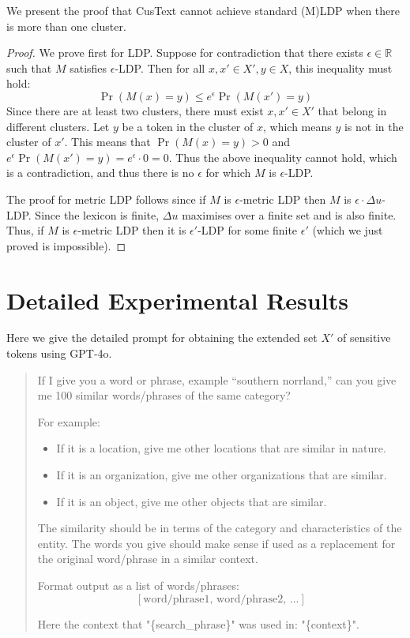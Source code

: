 We present the proof that CusText cannot achieve standard (M)LDP when there is more than one cluster.
\begin{proof}
    We prove first for LDP.  Suppose for contradiction that there exists $\epsilon\in \mathbb{R}$ such that $M$ satisfies $\epsilon$-LDP. Then for all $x, x' \in X', y \in X$, this inequality must hold: 
    $$
        \Pr(M(x) = y) \leq e^\epsilon \Pr(M(x') = y)
    $$
    Since there are at least two clusters, there must exist $x, x' \in X'$ that belong in different clusters. Let $y$ be a token in the cluster of $x$, which means $y$ is not in the cluster of $x'$. This means that $\Pr(M(x) = y) > 0$ and $e^\epsilon \Pr(M(x') = y) = e^\epsilon \cdot 0 = 0$. Thus the above inequality cannot hold, which is a contradiction, and thus there is no  $\epsilon$ for which $M$ is $\epsilon$-LDP.

     The proof for metric LDP follows since if $M$ is $\epsilon$-metric LDP then  $M$ is $\epsilon\cdot \Delta u$-LDP. Since the lexicon is finite, $\Delta u$ maximises over a finite set and is also finite. Thus, if $M$ is $\epsilon$-metric LDP then it is $\epsilon'$-LDP for some finite $\epsilon'$ (which we just proved is impossible).    
\end{proof}


\section{Detailed Experimental Results}

Here we give the detailed prompt for obtaining the extended set $X'$ of sensitive tokens using GPT-4o.

{\em
\begin{quote}
If I give you a word or phrase, example ``southern norrland,'' can you give me 100 similar words/phrases of the same category?

For example:
\begin{itemize}
    \item If it is a location, give me other locations that are similar in nature.
    \item If it is an organization, give me other organizations that are similar.
    \item If it is an object, give me other objects that are similar.
\end{itemize}

The similarity should be in terms of the category and characteristics of the entity. The words you give should make sense if used as a replacement for the original word/phrase in a similar context.

Format output as a list of words/phrases:
\[
[\text{word/phrase1, word/phrase2, ...}]
\]

Here the context that "\{search\_phrase\}" was used in: "\{context\}".
\end{quote}
}


